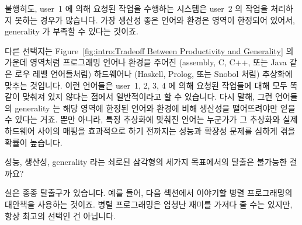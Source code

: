 불행히도, user~1 에 의해 요청된 작업을 수행하는 시스템은 user~2 의 작업을
처리하지 못하는 경우가 많습니다.
가장 생산성 좋은 언어와 환경은 영역이 한정되어 있어서, generality 가 부족할 수
있다는 것이죠.

다른 선택지는 Figure~\ref{fig:intro:Tradeoff Between Productivity and
Generality} 의 가운데 영역처럼 프로그래밍 언어나 환경을 주어진 (assembly, C,
C++, 또는 Java 같은 로우 레벨 언어들처럼) 하드웨어나 (Haskell, Prolog, 또는
Snobol 처럼) 추상화에 맞추는 것입니다.
이런 언어들은 user~1, 2, 3, 4 에 의해 요청된 작업들에 대해 모두 똑같이 맞춰져
있지 않다는 점에서 일반적이라고 할 수 있습니다.
다시 말해, 그런 언어들의 generality 는 해당 영역에 한정된 언어와 환경에 비해
생산성을 떨어뜨려야만 얻을 수 있다는 거죠.
뿐만 아니라, 특정 추상화에 맞춰진 언어는 누군가가 그 추상화와 실제 하드웨어
사이의 매핑을 효과적으로 하기 전까지는 성능과 확장성 문제를 심하게 겪을 확률이
높습니다.

성능, 생산성, generality 라는 쇠로된 삼각형의 세가지 목표에서의 탈출은 불가능한
걸까요?

실은 종종 탈출구가 있습니다. 예를 들어, 다음 섹션에서 이야기할 병렬
프로그래밍의 대안책을 사용하는 것이죠.
병렬 프로그래밍은 엄청난 재미를 가져다 줄 수는 있지만, 항상 최고의 선택인 건
아닙니다.

